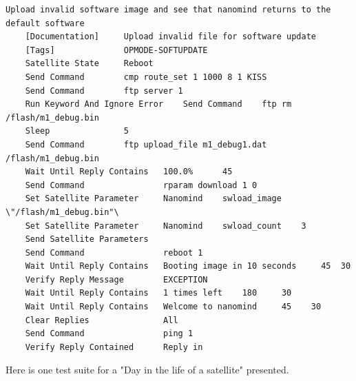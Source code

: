 \documentclass[english,12pt,a4paper,pdftex,elec,utf8]{aaltothesis}
\begin{document}
\begin{verbatim}
Upload invalid software image and see that nanomind returns to the default software
	[Documentation]		Upload invalid file for software update
	[Tags]				OPMODE-SOFTUPDATE
	Satellite State 	Reboot
	Send Command 		cmp route_set 1 1000 8 1 KISS
	Send Command 		ftp server 1
	Run Keyword And Ignore Error 	Send Command    ftp rm /flash/m1_debug.bin
	Sleep 				5
	Send Command		ftp upload_file m1_debug1.dat /flash/m1_debug.bin
	Wait Until Reply Contains   100.0% 		45
	Send Command 				rparam download 1 0
	Set Satellite Parameter		Nanomind 	swload_image	\"/flash/m1_debug.bin"\
	Set Satellite Parameter		Nanomind 	swload_count	3
	Send Satellite Parameters
	Send Command 				reboot 1
	Wait Until Reply Contains 	Booting image in 10 seconds 	45 	30
	Verify Reply Message 		EXCEPTION
	Wait Until Reply Contains   1 times left 	180 	30
	Wait Until Reply Contains 	Welcome to nanomind 	45    30
	Clear Replies 				All
	Send Command 				ping 1
	Verify Reply Contained 		Reply in

\end{verbatim}
\newpage
Here is one test suite for a "Day in the life of a satellite" presented.
\end{document}
